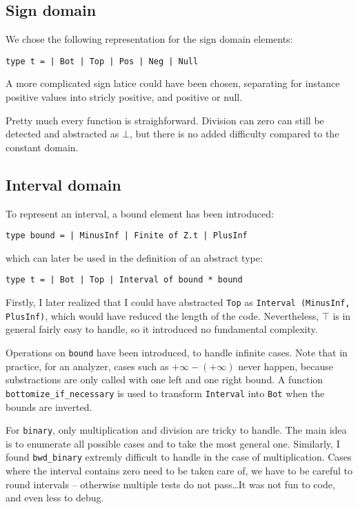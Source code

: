 \documentclass[12pt,a4paper]{article}
\begin{document}
\subsection{Sign domain}
We chose the following representation for the sign domain elements:
\begin{center}
    \texttt{type t = | Bot | Top | Pos | Neg | Null}
\end{center}
A more complicated sign latice could have been chosen, separating for instance positive values into stricly positive, and positive or null.

Pretty much every function is straighforward. Division can zero can still be detected and abstracted as $\bot$, but there is no added difficulty compared to the constant domain.

\subsection{Interval domain}
To represent an interval, a bound element has been introduced:
\begin{center}
    \texttt{type bound = | MinusInf | Finite of Z.t | PlusInf}
\end{center}
which can later be used in the definition of an abstract type:
\begin{center}
    \texttt{type t  = | Bot | Top | Interval of bound * bound}
\end{center}
Firstly, I later realized that I could have abstracted \texttt{Top} as \texttt{Interval (MinusInf, PlusInf)}, which would have reduced the length of the code. Nevertheless, $\top$ is in general fairly easy to handle, so it introduced no fundamental complexity.

Operations on \texttt{bound} have been introduced, to handle infinite cases. Note that in practice, for an analyzer, cases such as $+\infty - (+\infty)$ never happen, because substractions are only called with one left and one right bound.
A function \texttt{bottomize\_if\_necessary} is used to transform \texttt{Interval} into \texttt{Bot} when the bounds are inverted.

For \texttt{binary}, only multiplication and division are tricky to handle. The main idea is to enumerate all possible cases and to take the most general one. Similarly, I found \texttt{bwd\_binary} extremly difficult to handle in the case of multiplication. Cases where the interval contains zero need to be taken care of, we have to be careful to round intervals -- otherwise multiple tests do not pass\dots It was not fun to code, and even less to debug.
\end{document}
